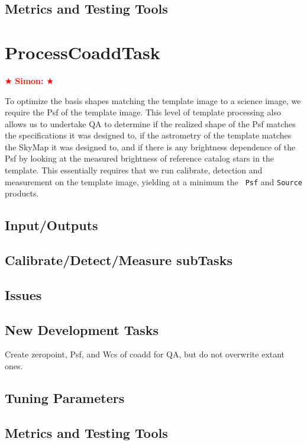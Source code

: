 \documentclass[12pt]{article}
\newcommand{\simon} { \textcolor{red} {
\ensuremath{\bigstar} {\bf Simon:}  
\ensuremath{\bigstar} } }
\begin{document}
\subsection{Metrics and Testing Tools}


\clearpage 
\section{ProcessCoaddTask} \simon

To optimize the basis shapes matching the template image to a science
image, we require the Psf of the template image.  This level of
template processing also allows us to undertake QA to determine if the
realized shape of the Psf matches the specifications it was designed
to, if the astrometry of the template matches the SkyMap it was
designed to, and if there is any brightness dependence of the Psf by
looking at the measured brightness of reference catalog stars in the
template.  This essentially requires that we run calibrate, detection
and measurement on the template image, yielding at a minimum the {\tt
  Psf} and {\tt Source} products.

\subsection{Input/Outputs}

\subsection{Calibrate/Detect/Measure subTasks}

\subsection{Issues}

\subsection{New Development Tasks}
Create zeropoint, Psf, and Wcs of coadd for QA, but do not overwrite
extant ones.

\subsection{Tuning Parameters}

\subsection{Metrics and Testing Tools}
\end{document}
